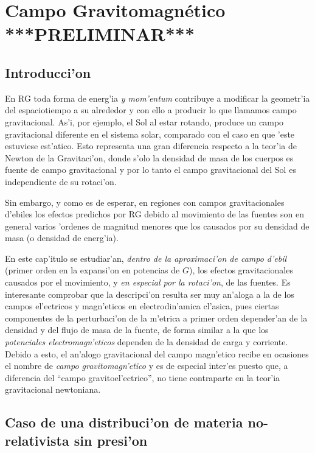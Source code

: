 \chapter{Campo Gravitomagn\'etico ***PRELIMINAR***}\label{cap:gravito}

\section{Introducci'on}

En RG toda forma de energ'ia \textit{y mom'entum} contribuye a modificar la geometr'ia del espaciotiempo a su alrededor y con ello a producir lo que llamamos campo gravitacional. As'i, por ejemplo, el Sol al estar rotando, produce un campo gravitacional diferente en el sistema solar, comparado con el caso en que 'este estuviese est'atico. Esto representa una gran diferencia respecto a la teor'ia de Newton de la Gravitaci'on, donde s'olo la densidad de masa de los cuerpos es fuente de campo gravitacional y por lo tanto el campo gravitacional del Sol es independiente de su rotaci'on.

Sin embargo, y como es de esperar, en regiones con campos gravitacionales d'ebiles los efectos predichos por RG debido al movimiento de las fuentes son en general varios 'ordenes de magnitud menores que los causados por su densidad de masa (o densidad de energ'ia).

En este cap'itulo se estudiar'an, \textit{dentro de la aproximaci'on de campo d'ebil} (primer orden en la expansi'on en potencias de $G$), los efectos gravitacionales causados por el movimiento, y \textit{en especial por la rotaci'on}, de las fuentes. Es interesante comprobar que la descripci'on resulta ser muy an'aloga a la de los campos el'ectricos y magn'eticos en electrodin'amica cl'asica, pues ciertas componentes de la perturbaci'on de la m'etrica a primer orden depender'an de la densidad y del flujo de masa de la fuente, de forma similar a la que los \textit{potenciales electromagn'eticos} dependen de la densidad de carga y corriente. Debido a esto, el an'alogo gravitacional del campo magn'etico recibe en ocasiones el nombre de \textit{campo gravitomagn'etico} y es de especial inter'es puesto que, a diferencia del ``campo gravitoel'ectrico'', no tiene contraparte en la teor'ia gravitacional newtoniana.


\section{Caso de una distribuci'on de materia no-relativista sin presi'on}\label{sec:CDNR}

